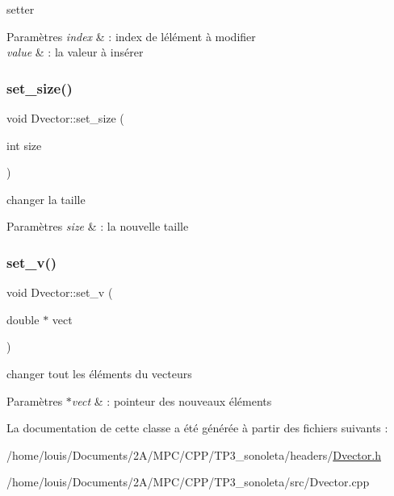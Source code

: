 setter 


\begin{DoxyParams}{Paramètres}
{\em index} & \+: index de l\textquotesingle{}élément à modifier \\
\hline
{\em value} & \+: la valeur à insérer \\
\hline
\end{DoxyParams}
\mbox{\label{class_dvector_a5d4b7a3273803031a7fb2b5516e5dd11}} 
\subsubsection{\texorpdfstring{set\+\_\+size()}{set\_size()}}
{\footnotesize\ttfamily void Dvector\+::set\+\_\+size (\begin{DoxyParamCaption}\item[{int}]{size }\end{DoxyParamCaption})}



changer la taille 


\begin{DoxyParams}{Paramètres}
{\em size} & \+: la nouvelle taille \\
\hline
\end{DoxyParams}
\mbox{\label{class_dvector_a99c6f3bc6f2d285ec2f9d8bd32a32218}} 
\subsubsection{\texorpdfstring{set\+\_\+v()}{set\_v()}}
{\footnotesize\ttfamily void Dvector\+::set\+\_\+v (\begin{DoxyParamCaption}\item[{double $\ast$}]{vect }\end{DoxyParamCaption})}



changer tout les éléments du vecteurs 


\begin{DoxyParams}{Paramètres}
{\em $\ast$vect} & \+: pointeur des nouveaux éléments \\
\hline
\end{DoxyParams}


La documentation de cette classe a été générée à partir des fichiers suivants \+:\begin{DoxyCompactItemize}
\item 
/home/louis/\+Documents/2\+A/\+M\+P\+C/\+C\+P\+P/\+T\+P3\+\_\+sonoleta/headers/\hyperlink{_dvector_8h}{Dvector.\+h}\item 
/home/louis/\+Documents/2\+A/\+M\+P\+C/\+C\+P\+P/\+T\+P3\+\_\+sonoleta/src/Dvector.\+cpp\end{DoxyCompactItemize}
